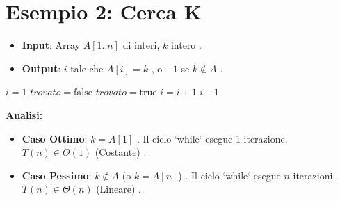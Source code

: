\section{Esempio 2: Cerca K }
\begin{itemize}
    \item \textbf{Input}: Array $A[1..n]$ di interi, $k$ intero .
    \item \textbf{Output}: $i$ tale che $A[i]=k$ , o $-1$ se $k \notin A$ .
\end{itemize}

\begin{algorithmic}[1]
    \State $i = 1$ 
    \State $trovato = \text{false}$ 
            \State $trovato = \text{true}$ 
        \Else
            \State $i = i + 1$ 
        \EndIf
    \EndWhile
        \State \Return $i$ 
    \Else
        \State \Return $-1$ 
    \EndIf
\EndProcedure
\end{algorithmic}

\textbf{Analisi:}
\begin{itemize}
    \item \textbf{Caso Ottimo}: $k = A[1]$ . Il ciclo `while` esegue 1 iterazione. $T(n) \in \Theta(1)$ (Costante) .
    \item \textbf{Caso Pessimo}: $k \notin A$ (o $k=A[n]$) . Il ciclo `while` esegue $n$ iterazioni. $T(n) \in \Theta(n)$ (Lineare) .
\end{itemize}


